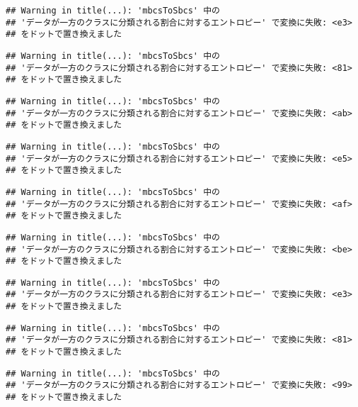 \documentclass[
]{article}
\begin{document}
\begin{verbatim}
## Warning in title(...): 'mbcsToSbcs' 中の
## 'データが一方のクラスに分類される割合に対するエントロピー' で変換に失敗: <e3>
## をドットで置き換えました
\end{verbatim}

\begin{verbatim}
## Warning in title(...): 'mbcsToSbcs' 中の
## 'データが一方のクラスに分類される割合に対するエントロピー' で変換に失敗: <81>
## をドットで置き換えました
\end{verbatim}

\begin{verbatim}
## Warning in title(...): 'mbcsToSbcs' 中の
## 'データが一方のクラスに分類される割合に対するエントロピー' で変換に失敗: <ab>
## をドットで置き換えました
\end{verbatim}

\begin{verbatim}
## Warning in title(...): 'mbcsToSbcs' 中の
## 'データが一方のクラスに分類される割合に対するエントロピー' で変換に失敗: <e5>
## をドットで置き換えました
\end{verbatim}

\begin{verbatim}
## Warning in title(...): 'mbcsToSbcs' 中の
## 'データが一方のクラスに分類される割合に対するエントロピー' で変換に失敗: <af>
## をドットで置き換えました
\end{verbatim}

\begin{verbatim}
## Warning in title(...): 'mbcsToSbcs' 中の
## 'データが一方のクラスに分類される割合に対するエントロピー' で変換に失敗: <be>
## をドットで置き換えました
\end{verbatim}

\begin{verbatim}
## Warning in title(...): 'mbcsToSbcs' 中の
## 'データが一方のクラスに分類される割合に対するエントロピー' で変換に失敗: <e3>
## をドットで置き換えました
\end{verbatim}

\begin{verbatim}
## Warning in title(...): 'mbcsToSbcs' 中の
## 'データが一方のクラスに分類される割合に対するエントロピー' で変換に失敗: <81>
## をドットで置き換えました
\end{verbatim}

\begin{verbatim}
## Warning in title(...): 'mbcsToSbcs' 中の
## 'データが一方のクラスに分類される割合に対するエントロピー' で変換に失敗: <99>
## をドットで置き換えました
\end{verbatim}
\end{document}
